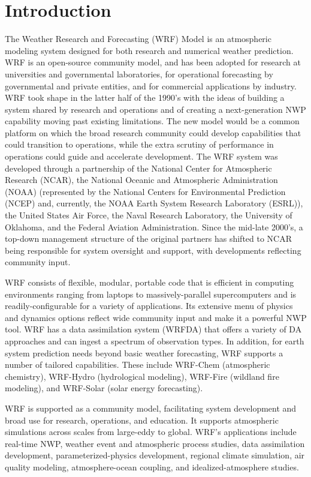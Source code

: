 \chapter{Introduction}
\label{introduction_chap}
The Weather Research and Forecasting (WRF) Model is
an atmospheric modeling system designed for both research and numerical 
weather prediction.  WRF is an open-source community model, and has been 
adopted for research at universities and governmental laboratories, 
for operational forecasting by governmental and private entities,
and for commercial applications by industry.  WRF took shape in the latter 
half of the 1990's with the ideas of building a system shared by research 
and operations and of creating a next-generation NWP capability moving 
past existing limitations.  The new model would be a 
common platform on which the broad research community 
could develop capabilities that could transition to operations, 
while the extra scrutiny of performance in operations
could guide and accelerate development.  The WRF system was developed
through a partnership of the National 
Center for Atmospheric Research (NCAR), the National Oceanic and Atmospheric 
Administration (NOAA) (represented by the National Centers for Environmental 
Prediction (NCEP) and, currently, the NOAA Earth System Research Laboratory (ESRL)), 
the United States Air Force, the Naval Research Laboratory, the 
University of Oklahoma, and the Federal Aviation Administration.  
Since the mid-late 2000's, a top-down management structure 
of the original partners has shifted to NCAR being responsible for system 
oversight and support, with developments reflecting community input. 

WRF consists of flexible, modular, portable code that is 
efficient in computing environments ranging from laptops to 
massively-parallel supercomputers and is readily-configurable for 
a variety of applications.  Its extensive menu of physics
and dynamics options reflect wide community input
and make it a powerful NWP tool.  WRF has a data assimilation system (WRFDA)
that offers a variety of DA approaches and can ingest a spectrum of 
observation types.  In addition, for earth system prediction needs 
beyond basic weather forecasting, WRF supports a number of tailored capabilities.  
These include WRF-Chem (atmospheric chemistry), 
WRF-Hydro (hydrological modeling), WRF-Fire (wildland fire modeling), 
and WRF-Solar (solar energy forecasting).

WRF is supported as a community model, facilitating system development
and broad use for research, operations, and education.  It supports  
atmospheric simulations across scales from large-eddy to global.  
WRF's applications include real-time NWP, weather event and 
atmospheric process studies, data assimilation development, 
parameterized-physics development, regional climate simulation, air 
quality modeling, atmosphere-ocean coupling, and idealized-atmosphere studies.  

